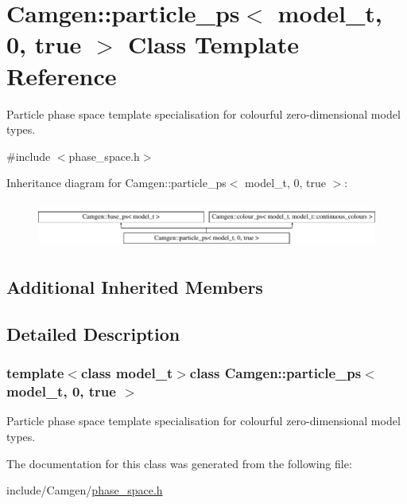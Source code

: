 \hypertarget{a00408}{}\section{Camgen\+:\+:particle\+\_\+ps$<$ model\+\_\+t, 0, true $>$ Class Template Reference}
\label{a00408}


Particle phase space template specialisation for colourful zero-\/dimensional model types.  




{\ttfamily \#include $<$phase\+\_\+space.\+h$>$}

Inheritance diagram for Camgen\+:\+:particle\+\_\+ps$<$ model\+\_\+t, 0, true $>$\+:\begin{figure}[H]
\begin{center}
\leavevmode
\includegraphics[height=1.542700cm]{a00408}
\end{center}
\end{figure}
\subsection*{Additional Inherited Members}


\subsection{Detailed Description}
\subsubsection*{template$<$class model\+\_\+t$>$class Camgen\+::particle\+\_\+ps$<$ model\+\_\+t, 0, true $>$}

Particle phase space template specialisation for colourful zero-\/dimensional model types. 

The documentation for this class was generated from the following file\+:\begin{DoxyCompactItemize}
\item 
include/\+Camgen/\hyperlink{a00718}{phase\+\_\+space.\+h}\end{DoxyCompactItemize}
